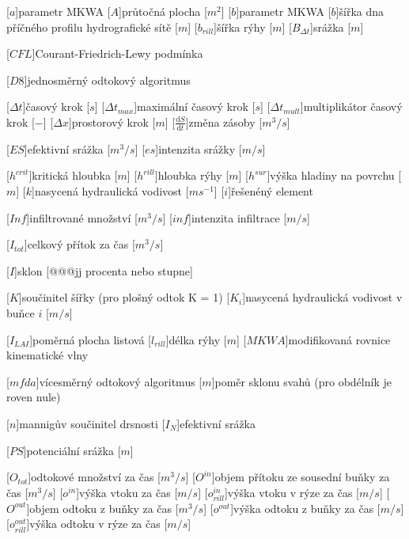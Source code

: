 \begin{acronym}
\setlength{\parskip}{0ex}
\setlength{\itemsep}{1ex}

[$a$]{parametr MKWA}
[$A$]{průtočná plocha  [$m^{2}$]}
[$b$]{parametr MKWA}
[$b$]{šířka dna příčného profilu hydrografické sítě [$m$]}
[$b_{rill}$]{šířka rýhy [$m$]}
[$B_{\Delta t}$]{srážka [$m$]}

[$CFL$]{Courant-Friedrich-Lewy podmínka}


[$D8$]{jednosměrný odtokový algoritmus}

[$\Delta t$]{časový krok [$s$]}
[$\Delta t_{max}$]{maximální časový krok [$s$]}
[$\Delta t_{mult}$]{multiplikátor časový krok [$-$]}
[$\Delta x$]{prostorový krok [$m$]}
[$\frac{\mathrm{d}S}{\mathrm{d}t}$]{změna zásoby [$m^3/s$]}

[$ES$]{efektivní srážka [$m^3/s$]}
[$es$]{intenzita srážky [$m/s$]}

[$h^{crit}$]{kritická hloubka [$m$]}
[$h^{rill}$]{hloubka rýhy [$m$]}
[$h^{sur}$]{výška hladiny na povrchu [$m$]}
[$k$]{nasycená hydraulická vodivost [$m s^{-1}$]}
[$i$]{řešenéný element}

[$Inf$]{infiltrované množství [$m^3/s$]}
[$inf$]{intenzita infiltrace [$m/s$]}

[$I_{tot}$]{celkový přítok za čas [$m^3/s$]}

[$I$]{sklon [@@@jj procenta nebo stupne]}

[$K$]{součinitel šířky (pro plošný odtok K = 1)}
[$K_i$]{nasycená hydraulická vodivost v buňce $i$ [$m/s$]}

[$I_{LAI}$]{poměrná plocha listová}
[$l_{rill}$]{délka rýhy [$m$]}
[$MKWA$]{modifikovaná rovnice kinematické vlny}

[$mfda$]{vícesměrný odtokový algoritmus}
[$m$]{poměr sklonu svahů (pro obdélník je roven nule)}

[$n$]{mannigův součinitel drsnosti}
[$I_{N}$]{efektivní srážka}

[$PS$]{potenciální srážka [$m$]}

[$O_{tot}$]{odtokové množství za čas [$m^{3}/s$]}
[$O^{in}$]{objem přítoku ze sousední buňky  za čas [$m^{3}/s$]}
[$o^{in}$]{výška vtoku za čas [$m/s$]}
[$o^{in}_{rill}$]{výška vtoku v rýze za čas [$m/s$]}
[$O^{out}$]{objem odtoku z buňky  za čas [$m^{3}/s$]}
[$o^{out}$]{výška odtoku z buňky  za čas [$m/s$]}
[$o^{out}_{rill}$]{výška odtoku v rýze za čas [$m/s$]}



\end{acronym}
